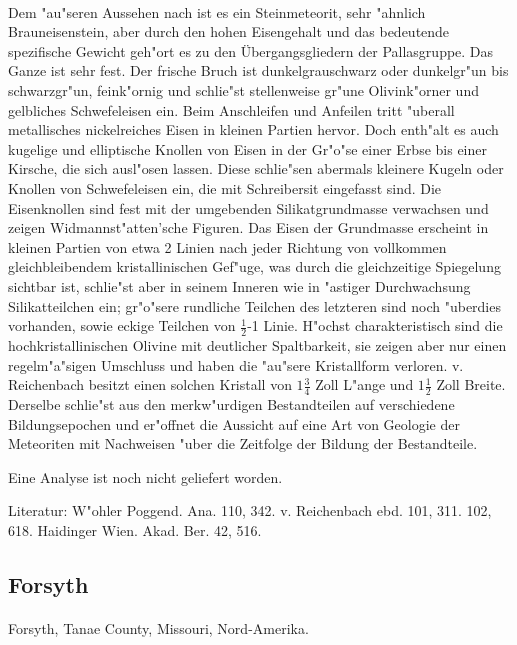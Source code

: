\documentclass[a4paper, 11pt, oneside]{article}
\begin{document}
\paragraph{}
Dem "au"seren Aussehen nach ist es ein Steinmeteorit, sehr "ahnlich Brauneisenstein, aber durch den hohen Eisengehalt und das bedeutende spezifische Gewicht geh"ort es zu den Übergangsgliedern der Pallasgruppe. Das Ganze ist sehr fest. Der frische Bruch ist dunkelgrauschwarz oder dunkelgr"un bis schwarzgr"un, feink"ornig und schlie"st stellenweise gr"une Olivink"orner und gelbliches Schwefeleisen ein. Beim Anschleifen und Anfeilen tritt "uberall metallisches nickelreiches Eisen in kleinen Partien hervor. Doch enth"alt es auch kugelige und elliptische Knollen von Eisen in der Gr"o"se einer Erbse bis einer Kirsche, die sich ausl"osen lassen. Diese schlie"sen abermals kleinere Kugeln oder Knollen von Schwefeleisen ein, die mit Schreibersit eingefasst sind. Die Eisenknollen sind fest mit der umgebenden Silikatgrundmasse verwachsen und zeigen Widmannst"atten'sche Figuren. Das Eisen der Grundmasse erscheint in kleinen Partien von etwa 2 Linien nach jeder Richtung von vollkommen gleichbleibendem kristallinischen Gef"uge, was durch die gleichzeitige Spiegelung sichtbar ist, schlie"st aber in seinem Inneren wie in "astiger Durchwachsung Silikatteilchen ein; gr"o"sere rundliche Teilchen des letzteren sind noch "uberdies vorhanden, sowie eckige Teilchen von $\frac{1}{2}$-1 Linie. H"ochst charakteristisch sind die hochkristallinischen Olivine mit deutlicher Spaltbarkeit, sie zeigen aber nur einen regelm"a"sigen Umschluss und haben die "au"sere Kristallform verloren. v. Reichenbach besitzt einen solchen Kristall von $1\frac{3}{4}$ Zoll L"ange und $1\frac{1}{2}$ Zoll Breite. Derselbe schlie"st aus den merkw"urdigen Bestandteilen auf verschiedene Bildungsepochen und er"offnet die Aussicht auf eine Art von Geologie der Meteoriten mit Nachweisen "uber die Zeitfolge der Bildung der Bestandteile.

Eine Analyse ist noch nicht geliefert worden.

\footnotesize
Literatur: W"ohler Poggend. Ana. 110, 342. v. Reichenbach ebd. 101, 311. 102, 618. Haidinger Wien. Akad. Ber. 42, 516.

\subsection{Forsyth}
\normalsize
\paragraph{}
Forsyth, Tanae County, Missouri, Nord-Amerika.
\end{document}
